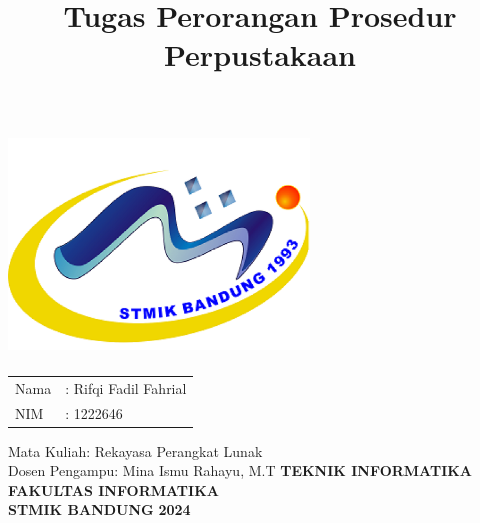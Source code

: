\documentclass[a4paper,12 pt]{article}
\title{\textbf{Tugas Perorangan }\linebreak 
\textbf{Prosedur Perpustakaan}\linebreak}
\date{}
\begin{document}
\maketitle
\thispagestyle{empty}
\begin{center}
\includegraphics[width=8cm,height=6cm]{logo}
\end{center}


\vspace{0.5 cm}
\begin{center}
\begin{tabular}{ll}
Nama & : Rifqi Fadil Fahrial \\
NIM & : 1222646\\
\end{tabular}
\newline
\newline
\newline
Mata Kuliah: Rekayasa Perangkat Lunak \\
Dosen Pengampu: Mina Ismu Rahayu, M.T \linebreak
\newline
\newline
\textbf {TEKNIK INFORMATIKA} \\
\textbf {FAKULTAS INFORMATIKA} \\
\textbf {STMIK BANDUNG}
\linebreak
\textbf {2024} \linebreak
\end{center}

\pagebreak

\tableofcontents
\clearpage
\end{document}
